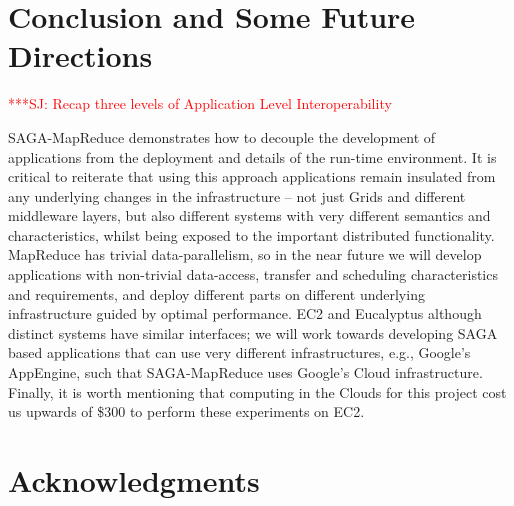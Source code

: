 \documentclass[conference,final]{IEEEtran}
\newcommand{\jhanote}[1]{ {\textcolor{red} { ***SJ: #1 }}}
\newcommand{\jhanote}[1]{}
\newcommand{\sagamapreduce }{SAGA-MapReduce }
\begin{document}
\section{Conclusion and Some Future Directions}

\jhanote{Recap three levels of Application Level Interoperability}

\sagamapreduce demonstrates how to decouple the development of
applications from the deployment and details of the run-time
environment.  It is critical to reiterate that using this approach
applications remain insulated from any underlying changes in the
infrastructure -- not just Grids and different middleware layers, but
also different systems with very different semantics and
characteristics, whilst being exposed to the important distributed
functionality.  MapReduce has trivial data-parallelism, so in the near
future we will develop applications with non-trivial data-access,
transfer and scheduling characteristics and requirements, and deploy
different parts on different underlying infrastructure guided by
optimal performance.  EC2 and Eucalyptus although distinct systems
have similar interfaces; we will work towards developing SAGA based
applications that can use very different infrastructures, e.g.,
Google's AppEngine, such that \sagamapreduce uses Google's Cloud
infrastructure.  Finally, it is worth mentioning that computing in the
Clouds for this project cost us upwards of \$300 to perform these
experiments on EC2.






\section{Acknowledgments}
\end{document}
